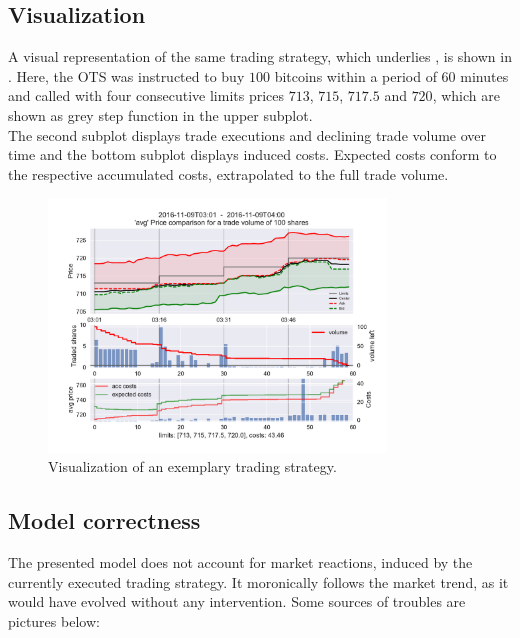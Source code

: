 \subsection{Visualization}
A visual representation of the same trading strategy, which underlies , is shown in . Here, the \ac{OTS} was instructed to buy $100$ bitcoins within a period of $60$ minutes and called with four consecutive limits prices $713$, $715$, $717.5$ and $720$, which are shown as grey step function in the upper subplot.\\

The second subplot displays trade executions and declining trade volume over time and the bottom subplot displays induced costs. Expected costs conform to the respective accumulated costs, extrapolated to the full trade volume.

\begin{figure}[ht]
	\centering
   \includegraphics[width=0.8\textwidth]{content/drawings/trading_example17_good}
	\caption{Visualization of an exemplary trading strategy.}
	\label{fig:tradingstrategy17good}
\end{figure}

\subsection{Model correctness}
\label{chap:modelcorrectness}
The presented model does not account for market reactions, induced by the currently executed trading strategy. It moronically follows the market trend, as it would have evolved without any intervention. Some sources of troubles are pictures below:

